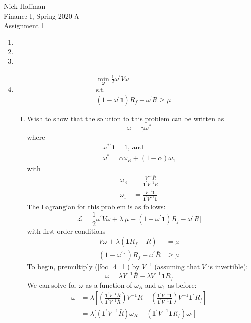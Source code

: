 \documentclass[11pt]{article}
\newcommand{\w}{\omega}
\newcommand{\p}{\prime}
\newcommand{\one}{\mathbf{1}}
\newcommand{\lagr}{\mathcal{L}}
\newcommand{\inv}[1]{#1^{-1}}
\begin{document}
	
\begin{flushleft}
	Nick Hoffman \\
	Finance I, Spring 2020 A \\
	Assignment 1 \\
\end{flushleft}

\begin{enumerate}
	\item 
	\item 
	\item 
	\item 
	\begin{gather*}
	\min_\w \frac{1}{2}\w^\p V \w \\
	\text{s.t.} \\
	(1 - \w^\p \one)R_f + \w^\p \bar{R} \geq \mu
	\end{gather*}
	\begin{enumerate}
		\item Wish to show that the solution to this problem can be written as 
		\[\w = \gamma \w^*\]
		where 
		\begin{gather*}
			\w^{*\p}\one = 1\text{, and} \\
			\w^* = \alpha \w_R + (1 - \alpha)\w_1
		\end{gather*}
		with 
		\begin{align*}
		\w_R &= \frac{\inv{V}\bar{R}}{\one^\p \inv{V} \bar{R}} \\
		\w_1 &= \frac{\inv{V} \one}{\one^\p \inv{V} \one}
		\end{align*}
		The Lagrangian for this problem is as follows:
		\[\lagr = \frac{1}{2}\w^\p V \w + \lambda \big[\mu - (1 - \w^\p \one)R_f - \w^\p \bar{R}\big] \]
		with first-order conditions
		\begin{align}
		V\w + \lambda(\one R_f - \bar{R}) &= \mu \label{foc_4_1}\\
		(1 - \w^\p \one)R_f + \w^\p \bar{R} &\geq \mu \label{foc_4_2}
		\end{align}
		To begin, premultiply (\ref{foc_4_1}) by $ \inv{V} $ (assuming that $ V $ is invertible):
		\[\w = \lambda \inv{V} \bar{R} - \lambda \inv{V} \one R_f\]
		We can solve for $ \w $ as a function of $ \w_R $ and $ \w_1 $ as before:
		\begin{align*}
		\w &= \lambda \left[\left(\frac{\one^\p \inv{V} \bar{R}}{\one^\p \inv{V} \bar{R}}\right)\inv{V}\bar{R} - \left(\frac{\one^\p \inv{V} \one}{\one^\p \inv{V} \one}\right)\inv{V}\one^\p R_f\right] \\
		&= \lambda \big[(\one^\p \inv{V}\bar{R})\w_R - (\one^\p \inv{V}\one R_f)\w_1\big]
		\end{align*}
		
	\end{enumerate}
\end{enumerate}
\end{document}
